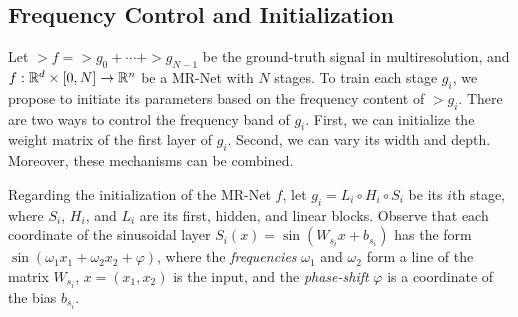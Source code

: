 
\subsection{Frequency Control and Initialization}
\label{s-frequency-initialization}


Let $\gt{f}=\gt{g}_0+\cdots+\gt{g}_{N-1}$ be the ground-truth signal in multiresolution, and $f:\mathbb{R}^d\times [0,N]\to \mathbb{R}^n$ be a MR-Net with $N$ stages. To train each stage $g_i$, we propose to initiate its parameters based on the frequency content of $\gt{g}_i$.
There are two ways to control the frequency band of $g_i$. First, we can initialize the weight matrix of the first layer of $g_i$. Second, we can vary its width and depth. Moreover, these mechanisms can be combined.

Regarding the initialization of the MR-Net $f$, let $g_i=L_i\circ H_i\circ S_i$ be its $i$th stage, where $S_i$, $H_i$, and $L_i$ are its first, hidden, and linear blocks.
Observe that each coordinate of the sinusoidal layer $S_i(x)=\sin\left(W_{s_i} x+b_{s_i}\right)$ has the form $\sin(\omega_1 x_1 +\omega_2 x_2 + \varphi)$, where the \textit{frequencies} $\omega_1$ and $\omega_2$ form a line of the matrix $W_{s_i}$, $x=(x_1,x_2)$ is the input, and the \textit{phase-shift} $ \varphi$ is a coordinate of the bias $b_{s_i}$. 

